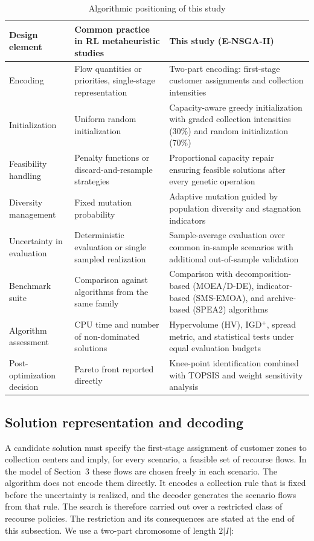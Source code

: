 \documentclass[11pt, a4paper]{article}
\begin{document}
\begin{table}[htbp]
\centering
\caption{Algorithmic positioning of this study}
\label{tab:AlgPositioning}
\renewcommand{\arraystretch}{1.2}
\fontsize{10.00pt}{10.00pt}\selectfont
\begin{tabular}{p{2.1cm}p{6.0cm}p{6.2cm}}
\toprule
\textbf{Design element} &
\textbf{Common practice in RL metaheuristic studies} &
\textbf{This study (E-NSGA-II)} \\
\midrule
Encoding &
Flow quantities or priorities, single-stage representation &
Two-part encoding: first-stage customer assignments and collection intensities \\
\midrule
Initialization &
Uniform random initialization &
Capacity-aware greedy initialization with graded collection intensities (30\%) and random initialization (70\%) \\
\midrule
Feasibility handling &
Penalty functions or discard-and-resample strategies &
Proportional capacity repair ensuring feasible solutions after every genetic operation \\
\midrule
Diversity management &
Fixed mutation probability &
Adaptive mutation guided by population diversity and stagnation indicators \\
\midrule
Uncertainty in evaluation &
Deterministic evaluation or single sampled realization &
Sample-average evaluation over common in-sample scenarios with additional out-of-sample validation \\
\midrule
Benchmark suite &
Comparison against algorithms from the same family &
Comparison with decomposition-based (MOEA/D-DE), indicator-based (SMS-EMOA), and archive-based (SPEA2) algorithms \\
\midrule
Algorithm assessment &
CPU time and number of non-dominated solutions &
Hypervolume (HV), IGD$^{+}$, spread metric, and statistical tests under equal evaluation budgets \\
\midrule
Post-optimization decision &
Pareto front reported directly &
Knee-point identification combined with TOPSIS and weight sensitivity analysis \\
\bottomrule
\end{tabular}
\end{table}\fi
\subsection{Solution representation and decoding}\label{sec:representation}
A candidate solution must specify the first-stage assignment of customer
zones to collection centers and imply, for every scenario, a feasible
set of recourse flows. In the model of Section~3 these flows are chosen freely in each scenario. The algorithm does not encode them directly. It encodes a collection rule that is fixed before the uncertainty is realized, and the decoder generates the scenario flows from that rule. The search is therefore carried out over a restricted class of recourse policies. The restriction and its consequences are stated at the end of this subsection. We use a two-part chromosome of length $2|I|$:
\end{document}
